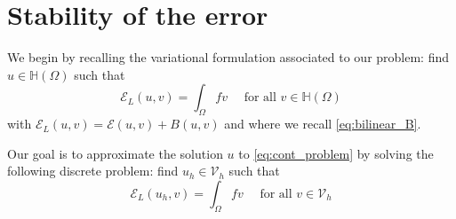\documentclass[10 pt]{article}
\numberwithin{equation}{section}
\def\cE{\mathcal{E}}
\begin{document}
\section{Stability of the error}\label{sec:error}

We begin by recalling the variational formulation associated to our problem: find $u\in\mathbb H(\Omega)$ such that 
%
\begin{equation}\label{eq:cont_problem}
    \cE_{L}(u,v)=\int_{\Omega}f v \quad \text{ for all } v\in \mathbb H(\Omega)
\end{equation}
%
with $\cE_{L}(u,v)=\cE(u,v)+B(u,v)$ and where we recall \eqref{eq:bilinear_B}.

Our goal is to approximate the solution $u$ to \eqref{eq:cont_problem} by solving the following discrete problem: find $u_h\in \mathcal V_h$ such that
%
\begin{equation}\label{eq:discr_problem}
    \cE_{L}(u_h,v)=\int_{\Omega} f v \quad \text{ for all } v\in \mathcal V_h
\end{equation}
%
\end{document}
